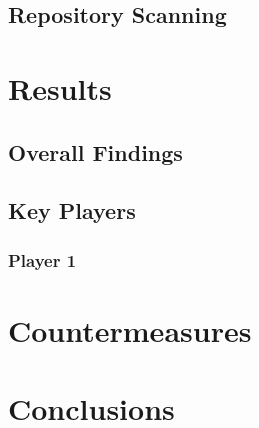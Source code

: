 \documentclass[]{acmart}
\begin{document}
\subsection*{Repository Scanning}
\section*{Results}
\subsection*{Overall Findings}
\subsection*{Key Players}
\subsubsection*{Player 1}
\section*{Countermeasures}
\section*{Conclusions}
\end{document}
